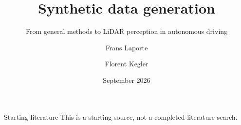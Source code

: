 \documentclass[aspectratio=169,11pt]{beamer}
\title[Synthetic data and LiDAR]{Synthetic data generation}
\subtitle{From general methods to LiDAR perception in autonomous driving}
\author{Frans Laporte \and Florent Kegler}
\institute{Topic contact: \TopicContactLink\\EE/ROB topics contact: \EEROBContactName}
\date{September 2026}
\begin{document}
\begin{frame}
\titlepage
\end{frame}





\begin{frame}{Starting literature}
\small
\printbibliography[heading=none]
\vspace{4mm}
{\footnotesize This is a starting source, not a completed literature search.}
\end{frame}

\end{document}
